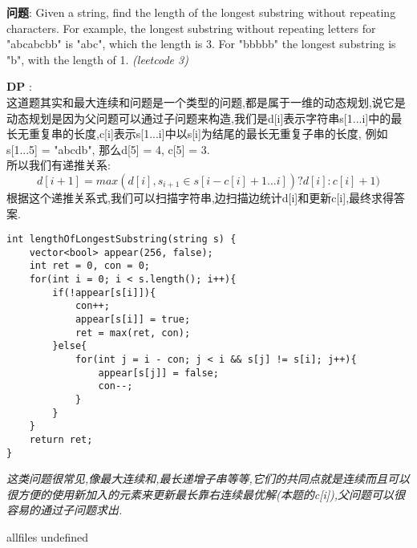 \documentclass{article}
\begin{document}
\begin{CJK}{UTF8}{gbsn}     %

\else
    
\begin{description}
    \item{\textbf{问题}}: Given a string, find the length of the longest substring without repeating characters. For example, the longest substring without repeating letters for "abcabcbb" is "abc", which the length is 3. For "bbbbb" the longest substring is "b", with the length of 1. \textit{(leetcode 3)}
    \item{\textbf{DP}} : 
    \\这道题其实和最大连续和问题是一个类型的问题,都是属于一维的动态规划,说它是动态规划是因为父问题可以通过子问题来构造,我们是d[i]表示字符串s[1...i]中的最长无重复串的长度,c[i]表示s[1...i]中以s[i]为结尾的最长无重复子串的长度, 例如s[1...5] = "abcdb", 那么d[5] = 4, c[5] = 3.\\
	所以我们有递推关系:\\
	$$d[i+1] = max(d[i], s_{i+1} \in s[i-c[i]+1...i])? d[i] : c[i]+1)$$
	根据这个递推关系式,我们可以扫描字符串,边扫描边统计d[i]和更新c[i],最终求得答案.
    \begin{lstlisting}
int lengthOfLongestSubstring(string s) {
	vector<bool> appear(256, false);
	int ret = 0, con = 0;
	for(int i = 0; i < s.length(); i++){
		if(!appear[s[i]]){
			con++;
			appear[s[i]] = true;
			ret = max(ret, con);
		}else{
			for(int j = i - con; j < i && s[j] != s[i]; j++){
				appear[s[j]] = false;
				con--;
			}
		}
	}
	return ret;
}
    \end{lstlisting}
    \textit{这类问题很常见,像最大连续和,最长递增子串等等,它们的共同点就是连续而且可以很方便的使用新加入的元素来更新最长靠右连续最优解(本题的c[i]),父问题可以很容易的通过子问题求出.}
\end{description}

\fi

\ifx allfiles undefined
\end{CJK}
\end{document}
